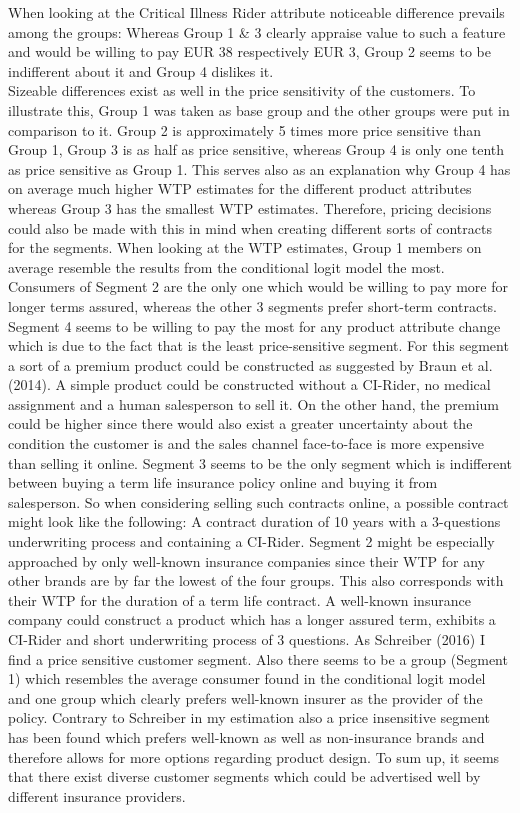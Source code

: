 \documentclass[12pt, abstracton]{article}
\begin{document}
When looking at the Critical Illness Rider attribute noticeable difference prevails among the groups: Whereas Group 1 \& 3 clearly appraise value to such a feature and would be willing to pay EUR 38 respectively EUR 3, Group 2 seems to be indifferent about it and Group 4 dislikes it.\\
Sizeable differences exist as well in the price sensitivity of the customers. To illustrate this, Group 1 was taken as base group and the other groups were put in comparison to it. Group 2 is approximately 5 times more price sensitive than Group 1, Group 3 is as half as price sensitive, whereas Group 4 is only one tenth as price sensitive as Group 1. This serves also as an explanation why Group 4 has on average much higher WTP estimates for the different product attributes whereas Group 3 has the smallest WTP estimates. Therefore, pricing decisions could also be made with this in mind when creating different sorts of contracts for the segments. When looking at the WTP estimates, Group 1 members on average resemble the results from the conditional logit model the most.\\
Consumers of Segment 2 are the only one which would be willing to pay more for longer terms assured, whereas the other 3 segments prefer short-term contracts. Segment 4 seems to be willing to pay the most for any product attribute change which is due to the fact that is the least price-sensitive segment. For this segment a sort of a premium product could be constructed as suggested by Braun et al. (2014). A simple product could be constructed without a CI-Rider, no medical assignment and a human salesperson to sell it. On the other hand, the premium could be higher since there would also exist a greater uncertainty about the condition the customer is and the sales channel face-to-face is more expensive than selling it online. Segment 3 seems to be the only segment which is indifferent between buying a term life insurance policy online and buying it from salesperson. So when considering selling such contracts online, a possible contract might look like the following: A contract duration of 10 years with a 3-questions underwriting process and containing a CI-Rider. Segment 2 might be especially approached by only well-known insurance companies since their WTP for any other brands are by far the lowest of the four groups. This also corresponds with their WTP for the duration of a term life contract. A well-known insurance company could construct a product which has a longer assured term, exhibits a CI-Rider and short underwriting process of 3 questions. As Schreiber (2016) I find a price sensitive customer segment. Also there seems to be a group (Segment 1) which resembles the average consumer found in the conditional logit model and one group which clearly prefers well-known insurer as the provider of the policy. Contrary to Schreiber in my estimation also a price insensitive segment has been found which prefers well-known as well as non-insurance brands and therefore allows for more options regarding product design. To sum up, it seems that there exist diverse customer segments which could be advertised well by different insurance providers.
\end{document}
